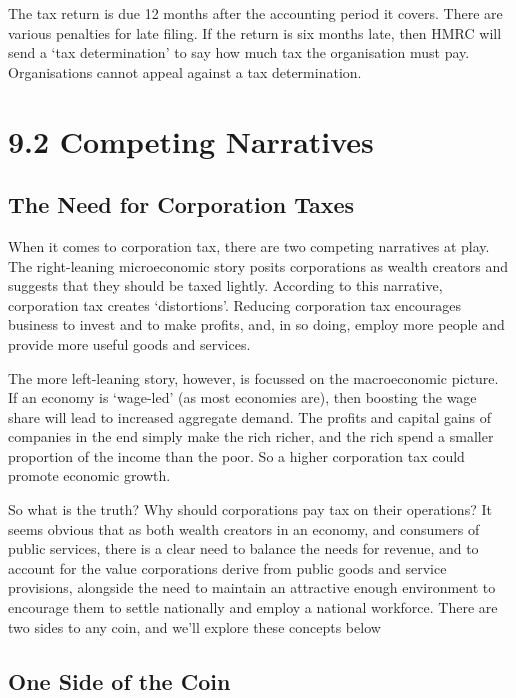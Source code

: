 \documentclass[]{tufte-handout}
\begin{document}
The tax return is due 12 months after the accounting period it covers.
There are various penalties for late filing. If the return is six months
late, then HMRC will send a `tax determination' to say how much tax the
organisation must pay. Organisations cannot appeal against a tax
determination.

\hypertarget{competing-narratives}{%
\section{9.2 Competing Narratives}\label{competing-narratives}}

\hypertarget{the-need-for-corporation-taxes}{%
\subsection{The Need for Corporation
Taxes}\label{the-need-for-corporation-taxes}}

When it comes to corporation tax, there are two competing narratives at
play. The right-leaning microeconomic story posits corporations as
wealth creators and suggests that they should be taxed lightly.
According to this narrative, corporation tax creates `distortions'.
Reducing corporation tax encourages business to invest and to make
profits, and, in so doing, employ more people and provide more useful
goods and services.

The more left-leaning story, however, is focussed on the macroeconomic
picture. If an economy is `wage-led' (as most economies are), then
boosting the wage share will lead to increased aggregate demand. The
profits and capital gains of companies in the end simply make the rich
richer, and the rich spend a smaller proportion of the income than the
poor. So a higher corporation tax could promote economic growth.

So what is the truth? Why should corporations pay tax on their
operations? It seems obvious that as both wealth creators in an economy,
and consumers of public services, there is a clear need to balance the
needs for revenue, and to account for the value corporations derive from
public goods and service provisions, alongside the need to maintain an
attractive enough environment to encourage them to settle nationally and
employ a national workforce. There are two sides to any coin, and we'll
explore these concepts below

\hypertarget{one-side-of-the-coin}{%
\subsection{One Side of the Coin}\label{one-side-of-the-coin}}
\end{document}
